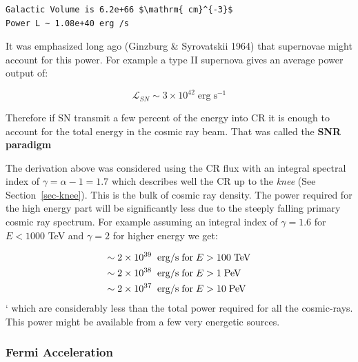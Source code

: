 \documentclass[
  letterpaper,
  DIV=11,
  numbers=noendperiod]{scrreprt}
\begin{document}
\begin{verbatim}
Galactic Volume is 6.2e+66 $\mathrm{ cm}^{-3}$
Power L ~ 1.08e+40 erg /s
\end{verbatim}

It was emphasized long ago (Ginzburg \& Syrovatskii 1964) that
supernovae might account for this power. For example a type II supernova
gives an average power output of:

\[\mathcal{L}_{SN} \sim 3 \times 10^{42} \mathrm{\;erg\;s}^{-1}\]

Therefore if SN transmit a few percent of the energy into CR it is
enough to account for the total energy in the cosmic ray beam. That was
called the \textbf{SNR paradigm}

\begin{tcolorbox}[enhanced jigsaw, colframe=quarto-callout-important-color-frame, leftrule=.75mm, left=2mm, opacitybacktitle=0.6, colbacktitle=quarto-callout-important-color!10!white, coltitle=black, arc=.35mm, titlerule=0mm, toprule=.15mm, opacityback=0, bottomrule=.15mm, breakable, bottomtitle=1mm, rightrule=.15mm, toptitle=1mm, colback=white, title=\textcolor{quarto-callout-important-color}{\faExclamation}\hspace{0.5em}{Power Required for \textgreater{} 100 TeV}]

The derivation above was considered using the CR flux with an integral
spectral index of \(\gamma = \alpha -1 =  1.7\) which describes well the
CR up to the \emph{knee} (See Section~\ref{sec-knee}). This is the bulk
of cosmic ray density. The power required for the high energy part will
be significantly less due to the steeply falling primary cosmic ray
spectrum. For example assuming an integral index of \(\gamma = 1.6\) for
\(E < 1000\) TeV and \(\gamma = 2\) for higher energy we get:

\[\begin{aligned}
\sim 2 \times 10^{39} {\;\rm\;erg/s\; for\; } E &> 100 \mathrm{\; TeV}\\
\sim 2 \times 10^{38} {\;\rm\;erg/s\; for\; } E &> 1 \mathrm{\;PeV}\\
 \sim 2 \times 10^{37} {\;\rm\;erg/s\; for\; } E &> 10 \mathrm{\;PeV}
 \end{aligned}\] ` which are considerably less than the total power
required for all the cosmic-rays. This power might be available from a
few very energetic sources.

\end{tcolorbox}

\subsubsection{Fermi Acceleration}\label{fermi-acceleration}
\end{document}
